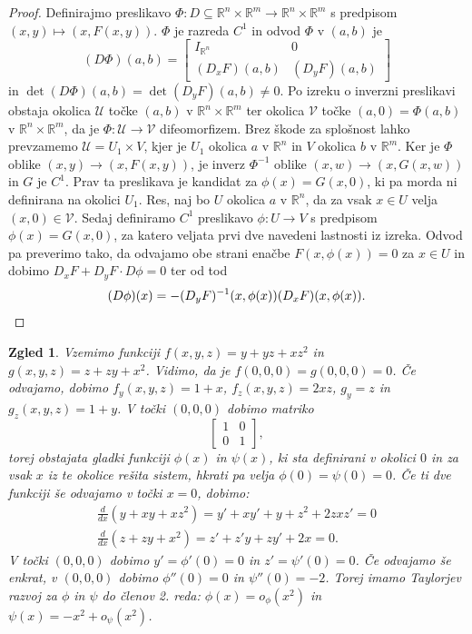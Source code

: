 \documentclass[10pt, a4paper]{article}
\newtheorem{zgled}{Zgled}[section]
\newenvironment{noticeC}{%
  \tcolorbox[%
  notitle,
  empty,
  enhanced,  %
  breakable,
  coltext=black, 
  fontupper=\rmfamily,
  parbox=false,
  noparskip,
  sharp corners,
  boxrule=-1pt,  %
  frame hidden,
  left=7pt,  %
  right=7pt,
  top=5pt,
  bottom=5pt,
  before skip=2.5ex plus 2pt,
  after skip=2.5ex plus 2pt,
  overlay unbroken and last={%
  },
  ]}
{\endtcolorbox}
\newenvironment{dokaz}%
  {\begin{noticeC}\begin{proof}}%
  {\end{proof}\end{noticeC}}
\newcommand{\R}{\mathbb {R}}
\begin{document}
\begin{dokaz}
    Definirajmo preslikavo $\Phi: D \subseteq \R^n \times \R^m \to \R^n \times \R^m$ s predpisom $(x, y) \mapsto (x, F(x, y))$.
    $\Phi$ je razreda $C^1$ in odvod $\Phi$ v $(a, b)$ je 
    $$(D \Phi) (a, b) = \begin{bmatrix}
        I_{\R^n} & 0\\
        (D_x F) (a, b) & (D_y F) (a, b)
    \end{bmatrix}$$
    in $\det (D \Phi) (a, b) = \det (D_y F) (a, b) \neq 0$.
    Po izreku o inverzni preslikavi obstaja okolica $\mathcal{U}$ točke $(a, b)$ v $\R^n \times \R^m$ ter 
    okolica $\mathcal{V}$ točke $(a, 0) = \Phi(a, b)$ v $\R^n \times \R^m$, da je $\Phi: \mathcal{U} \to \mathcal{V}$ 
    difeomorfizem. Brez škode za splošnost lahko prevzamemo $\mathcal{U} = U_1 \times V$, kjer je 
    $U_1$ okolica $a$ v $\R^n$ in $V$ okolica $b$ v $\R^m$.
    Ker je $\Phi$ oblike $(x, y) \to (x, F(x, y))$, je inverz $\Phi^{-1}$ oblike $(x, w) \to (x, G(x, w))$
    in $G$ je $C^1$.
    Prav ta preslikava je kandidat za $\phi(x) = G(x, 0)$, ki pa morda ni definirana na okolici $U_1$.
    Res, naj bo $U$ okolica $a$ v $\R^n$, da za vsak $x \in U$ velja $(x, 0) \in \mathcal{V}$.
    Sedaj definiramo $C^1$ preslikavo $\phi: U \to V$ s predpisom $\phi (x) = G(x, 0)$, 
    za katero veljata prvi dve navedeni lastnosti iz izreka. Odvod pa preverimo tako, 
    da odvajamo obe strani enačbe $F(x, \phi(x)) = 0$ za $x \in U$ in dobimo 
    $D_x F + D_y F \cdot D \phi = 0$ ter od tod 
    \begin{equation*}
        (D\phi) (x) = - (D_y F)^{-1} (x, \phi (x)) (D_x F) (x, \phi(x)). \qedhere
    \end{equation*}
\end{dokaz}

\begin{zgled}
    Vzemimo funkciji $f(x, y, z) = y + yz + xz^2$ in $g(x, y, z) = z + zy + x^2$.
    Vidimo, da je $f(0,0,0) = g(0,0,0) = 0$.
    Če odvajamo, dobimo $f_y (x, y, z) = 1 + x$, $f_z (x, y, z) = 2xz$, $g_y = z$ in $g_z (x, y, z) = 1 + y$.
    V točki $(0,0,0)$ dobimo matriko $$\begin{bmatrix}
        1 & 0\\
        0 & 1
    \end{bmatrix},$$
    torej obstajata gladki funkciji $\phi(x)$ in $\psi (x)$, ki sta definirani v okolici $0$
    in za vsak $x$ iz te okolice rešita sistem, hkrati pa velja $\phi(0) = \psi (0) = 0$.
    Če ti dve funkciji še odvajamo v točki $x = 0$, dobimo:
    \begin{gather*}
        \frac{d}{dx} (y + xy + xz^2) = y' + xy' + y + z^2 + 2zxz' = 0\\
        \frac{d}{dx} (z + zy + x^2) = z' + z'y + z y' + 2x = 0.
    \end{gather*}
    V točki $(0,0,0)$ dobimo $y' = \phi'(0) = 0$ in $z' = \psi' (0) = 0$.
    Če odvajamo še enkrat, v $(0,0,0)$ dobimo $\phi'' (0) = 0$ in $\psi'' (0) = -2$.
    Torej imamo Taylorjev razvoj za $\phi$ in $\psi$ do členov 2. reda: $\phi(x) = o_\phi (x^2)$ in $\psi(x) = - x^2 + o_\psi (x^2)$.
\end{zgled}
\end{document}
